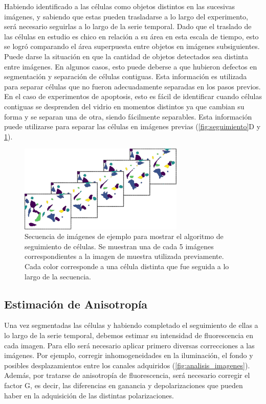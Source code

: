 Habiendo identificado a las células como objetos distintos en las sucesivas imágenes, y sabiendo que estas pueden trasladarse a lo largo del experimento, será necesario seguirlas a lo largo de la serie temporal. Dado que el traslado de las células en estudio es chico en relación a su área en esta escala de tiempo, esto se logró comparando el área superpuesta entre objetos en imágenes subsiguientes. Puede darse la situación en que la cantidad de objetos detectados sea distinta entre imágenes. En algunos casos, esto puede deberse a que hubieron defectos en segmentación y separación de células contiguas. Esta información es utilizada para separar células que no fueron adecuadamente separadas en los pasos previos. En el caso de experimentos de apoptosis, esto es fácil de identificar cuando células contiguas se desprenden del vidrio en momentos distintos ya que cambian su forma y se separan una de otra, siendo fácilmente separables. Esta información puede utilizarse para separar las células en imágenes previas (\cref{fig:seguimiento}D y \cref{fig:track_many}).

\begin{figure}
    \centering
    \includegraphics[width=0.7\textwidth]{img/cap_2/tracking_many.pdf}
    \caption{\footnotesize{Secuencia de imágenes de ejemplo para mostrar el algoritmo de seguimiento de células. Se muestran una de cada 5 imágenes correspondientes a la imagen de muestra utilizada previamente. Cada color corresponde a una célula distinta que fue seguida a lo largo de la secuencia.}}
    \label{fig:track_many}
\end{figure}


\subsection{Estimación de Anisotropía}
\label{sec:matmet:CalculoAnisotropia}


Una vez segmentadas las células y habiendo completado el seguimiento de ellas a lo largo de la serie temporal, debemos estimar su intensidad de fluorescencia en cada imagen. Para ello será necesario aplicar primero diversas correcciones a las imágenes. Por ejemplo, corregir inhomogeneidades en la iluminación, el fondo y posibles desplazamientos entre los canales adquiridos (\cref{fig:analisis_imagenes}). Además, por tratarse de anisotropía de fluorescencia, será necesario corregir el factor G, es decir, las diferencias en ganancia y depolarizaciones que pueden haber en la adquisición de las distintas polarizaciones.

